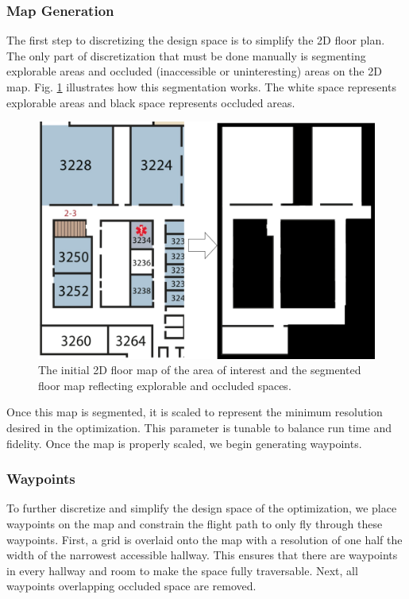\documentclass[letterpaper, 10 pt, conference]{ieeeconf}  %
\begin{document}
\subsubsection{Map Generation}

The first step to discretizing the design space is to simplify the 2D floor plan. The only part of discretization that must be done manually is segmenting explorable areas and occluded (inaccessible or uninteresting) areas on the 2D map. Fig. \ref{fig:map_gen} illustrates how this segmentation works. The white space represents explorable areas and black space represents occluded areas.

\begin{figure}
\centering
\includegraphics[width=1.0\linewidth]{figures/map_bw.png}
\caption{The initial 2D floor map of the area of interest and the segmented floor map reflecting explorable and occluded spaces.}
\label{fig:map_gen}
\end{figure}

Once this map is segmented, it is scaled to represent the minimum resolution desired in the optimization. This parameter is tunable to balance run time and fidelity. Once the map is properly scaled, we begin generating waypoints.

\subsubsection{Waypoints}

To further discretize and simplify the design space of the optimization, we place waypoints on the map and constrain the flight path to only fly through these waypoints. First, a grid is overlaid onto the map with a resolution of one half the width of the narrowest accessible hallway. This ensures that there are waypoints in every hallway and room to make the space fully traversable. Next, all waypoints overlapping occluded space are removed.
\end{document}
